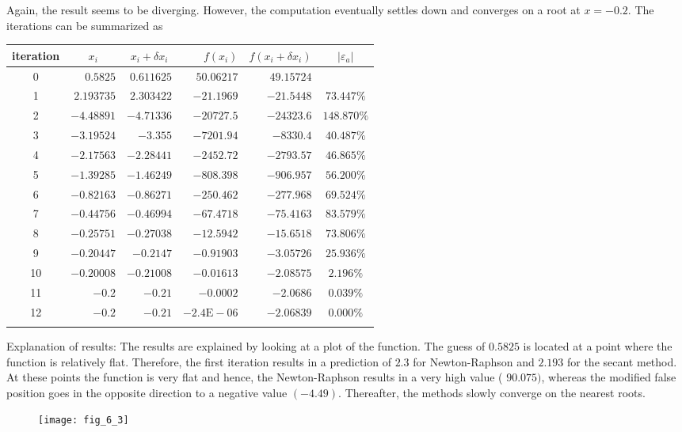 \documentclass[../main.tex]{subfiles}
\begin{document}
\begin{enumerate}[label=\bfseries(\alph*)]
\bigbreak
Again, the result seems to be diverging. However, the computation eventually settles down and converges on a root at $x=-0.2$. The iterations can be summarized as
\bigbreak

\begin{tabular}{crrrrc}
\Xhline{1.5pt}
iteration & \multicolumn{1}{c}{$x_{i}$} & \multicolumn{1}{c}{$x_{i}+\delta x_{i}$} & $f\left(x_{i}\right)$ & $f\left(x_{i}+\delta x_{i}\right)$ & $\left|\varepsilon_{a}\right|$ \\
\hline
0 & $0.5825$ & $0.611625$ & $50.06217$ & $49.15724$ &  \\
1 & $2.193735$ & $2.303422$ & $-21.1969$ & $-21.5448$ & $73.447 \%$ \\
2 & $-4.48891$ & $-4.71336$ & $-20727.5$ & $-24323.6$ & $148.870 \%$ \\
3 & $-3.19524$ & $-3.355$ & $-7201.94$ & $-8330.4$ & $40.487 \%$ \\
4 & $-2.17563$ & $-2.28441$ & $-2452.72$ & $-2793.57$ & $46.865 \%$ \\
5 & $-1.39285$ & $-1.46249$ & $-808.398$ & $-906.957$ & $56.200 \%$ \\
6 & $-0.82163$ & $-0.86271$ & $-250.462$ & $-277.968$ & $69.524 \%$ \\
7 & $-0.44756$ & $-0.46994$ & $-67.4718$ & $-75.4163$ & $83.579 \%$ \\
8 & $-0.25751$ & $-0.27038$ & $-12.5942$ & $-15.6518$ & $73.806 \%$ \\
9 & $-0.20447$ & $-0.2147$ & $-0.91903$ & $-3.05726$ & $25.936 \%$ \\
10 & $-0.20008$ & $-0.21008$ & $-0.01613$ & $-2.08575$ & $2.196 \%$ \\
11 & $-0.2$ & $-0.21$ & $-0.0002$ & $-2.0686$ & $0.039 \%$ \\
12 & $-0.2$ & $-0.21$ & $-2.4 \mathrm{E}-06$ & $-2.06839$ & $0.000 \%$ \\
\Xhline{1.5pt}
\end{tabular}
\bigbreak
Explanation of results: The results are explained by looking at a plot of the function. The guess of $0.5825$ is located at a point where the function is relatively flat. Therefore, the first iteration results in a prediction of $2.3$ for Newton-Raphson and $2.193$ for the secant method. At these points the function is very flat and hence, the Newton-Raphson results in a very high value ( $90.075)$, whereas the modified false position goes in the opposite direction to a negative value $(-4.49)$. Thereafter, the methods slowly converge on the nearest roots.
\bigbreak
\begin{figure}[H]
		\hspace*{0.7cm}\texttt{[image: fig\_6\_3]}
		\label{fig:fig_6_3}
	\end{figure}
	\bigbreak



\end{enumerate}
\end{document}
